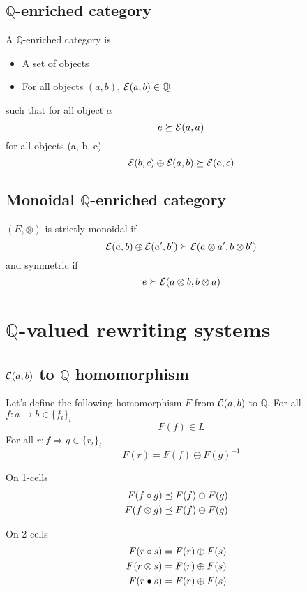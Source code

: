 \documentclass[a4paper]{article}
\begin{document}
\subsection{$\mathbb{Q}$-enriched category}

A $\mathbb{Q}$-enriched category \catE is

\begin{itemize}
\item A set of objects
\item For all objects $(a, b)$, ${\cal E}(a, b) \in \mathbb{Q}$
\end{itemize}

such that for all object $a$
\[
e \succeq {\cal E}(a, a)
\]
for all objects (a, b, c)
\[
{\cal E}(b, c) \oplus {\cal E}(a, b) \succeq {\cal E}(a, c)
\]

\subsection{Monoidal $\mathbb{Q}$-enriched category}

$(E, \otimes)$ is strictly monoidal if
\[
{\cal E}(a, b) \oplus {\cal E}(a', b') \succeq {\cal E}(a \otimes a', b \otimes b')
\]
and symmetric if
\[
e \succeq {\cal E}(a \otimes b, b \otimes a)
\]


\section{$\mathbb{Q}$-valued rewriting systems}

\subsection{${\cal C}(a, b)$ to $\mathbb{Q}$ homomorphism}

Let's define the following homomorphism $F$ from ${\cal C}(a, b)$ to $\mathbb{Q}$. For all $f: a \to b \in \{f_i\}_i$
\[
F(f) \in L
\]
For all $r: f \Rightarrow g \in \{r_i\}_i$
\[
F(r) = F(f) \oplus F(g)^{-1}
\]

On 1-cells
\begin{align}
F(f \circ g) &\preceq F(f) \oplus F(g) \cr
F(f \otimes g) &\preceq F(f) \oplus F(g)
\end{align}

On 2-cells
\begin{align}
F(r \circ s) &= F(r) \oplus F(s) \cr
F(r \otimes s) &= F(r) \oplus F(s) \cr
F(r \bullet s) &= F(r) \oplus F(s)
\end{align}
\end{document}
